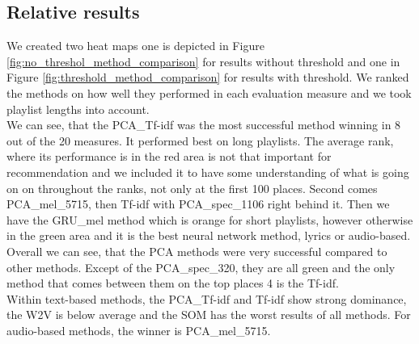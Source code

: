 \subsection{Relative results}\label{ssec:relative_comparison}
We created two heat maps one is depicted in Figure \ref{fig:no_threshol_method_comparison} for results without threshold and one in Figure \ref{fig:threshold_method_comparison} for results with threshold. We ranked the methods on how well they performed in each evaluation measure and we took playlist lengths into account. \\
We can see, that the PCA\_Tf-idf was the most successful method winning in 8 out of the 20 measures. It performed best on long playlists. The average rank, where its performance is in the red area is not that important for recommendation and we included it to have some understanding of what is going on on throughout the ranks, not only at the first 100 places. Second comes PCA\_mel\_5715, then Tf-idf with PCA\_spec\_1106 right behind it. Then we have the GRU\_mel method which is orange for short playlists, however otherwise in the green area and it is the best neural network method, lyrics or audio-based. \\
Overall we can see, that the PCA methods were very successful compared to other methods. Except of the PCA\_spec\_320, they are all green and the only method that comes between them on the top places 4 is the Tf-idf. \\
Within text-based methods, the PCA\_Tf-idf and Tf-idf show strong dominance, the W2V is below average and the SOM has the worst results of all methods. For audio-based methods, the winner is PCA\_mel\_5715. \\

